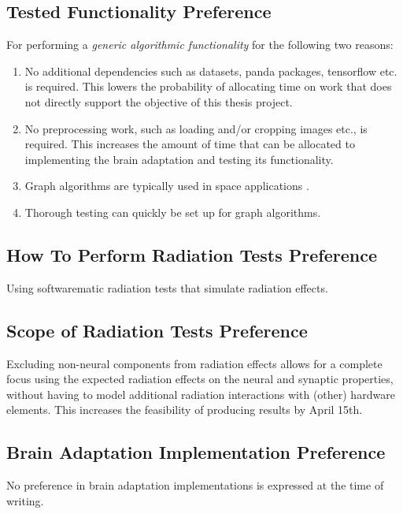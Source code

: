 \subsection{Tested Functionality Preference}\label{subsec:baseline_tested_functionality_preference}
For performing a \textit{generic algorithmic functionality} for the following two reasons:
\begin{enumerate}
    \item No additional dependencies such as datasets, panda packages, tensorflow etc. is required. This lowers the probability of allocating time on work that does not directly support the objective of this thesis project.
    \item No preprocessing work, such as loading and/or cropping images etc.,  is required. This increases the amount of time that can be allocated to implementing the brain adaptation and testing its functionality.
    \item Graph algorithms are typically used in space applications \cite{todo}.%
    \item Thorough testing can quickly be set up for graph algorithms.
\end{enumerate}
 
\subsection{How To Perform Radiation Tests Preference}\label{subsec:baseline_how_to_perform_radiation_tests_preference}
Using softwarematic radiation tests that simulate radiation effects.

\subsection{Scope of Radiation Tests Preference}\label{subsec:baseline_scope_of_radiation_tests_preference}
Excluding non-neural components from radiation effects allows for a complete focus using the expected radiation effects on the neural and synaptic properties, without having to model additional radiation interactions with (other) hardware elements. This increases the feasibility of producing results by April 15th.

\subsection{Brain Adaptation Implementation Preference}\label{subsec:baseline_brain_adaptation_implementation_preference}
No preference in brain adaptation implementations is expressed at the time of writing.

